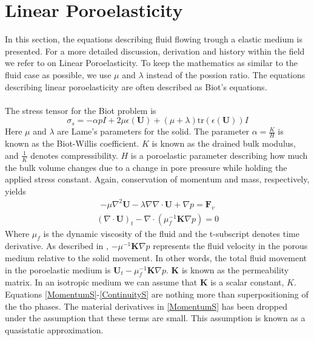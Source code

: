 \section{Linear Poroelasticity}
In this section, the equations describing fluid flowing trough a elastic medium is presented. For a more detailed discussion, derivation and history within the field we refer to \cite{Wang00} on Linear Poroelasticity. To keep the mathematics as similar to the fluid case as possible, we use $\mu$ and $\lambda$ instead of the possion ratio. The equations describing linear poroelasticity are often described as Biot's equations. 
\\
\\
The stress tensor for the Biot problem is 
\[ \sigma_s = -\alpha pI + 2\mu \epsilon(\mathbf{U}) + (\mu + \lambda)\text{tr}(\epsilon(\mathbf{U}))I  \]
Here $\mu$ and $\lambda$ are Lame's parameters for the solid. The parameter $\alpha = \frac{K}{H}$ is known as the Biot-Willis coefficient. $K$ is known as the drained bulk modulus, and $\frac{1}{K}$ denotes compressibility. $H$ is a poroelastic parameter describing how much the bulk volume changes due to a change in pore pressure while holding the applied stress constant. Again, conservation of momentum and mass, respectively, yields
\begin{align}
	 - \mu \nabla ^2 \mathbf{U}
	 - \lambda \nabla \nabla \cdot \mathbf{U}
	 + \nabla p = \mathbf{F}_v \label{MomentumS}
\end{align}
\begin{align}
	 (\nabla \cdot \mathbf{U})_t
	 - \nabla \cdot (\mu_f^{-1} \mathbf{K} \nabla p) 
	 = 0 \label{ContinuityS}
\end{align}
Where $\mu_f$ is the dynamic viscosity of the fluid and the t-subscript denotes time derivative. As described in \cite{Niel13}, $-\mu^{-1}\mathbf{K} \nabla p$ represents the fluid velocity in the porous medium relative to the solid movement. In other words, the total fluid movement in the poroelastic medium is $\mathbf{U}_t - \mu_f^{-1}\mathbf{K} \nabla p$. $\mathbf{K}$ is known as the permeability matrix. In an isotropic medium we can assume that $\mathbf{K}$ is a scalar constant, $K$.
\\
Equations \eqref{MomentumS}-\eqref{ContinuityS} are nothing more than superpositioning of the tho phases. The material derivatives in \eqref{MomentumS} has been dropped under the assumption that these terms are small. This assumption is known as a quasistatic approximation. 
\\

